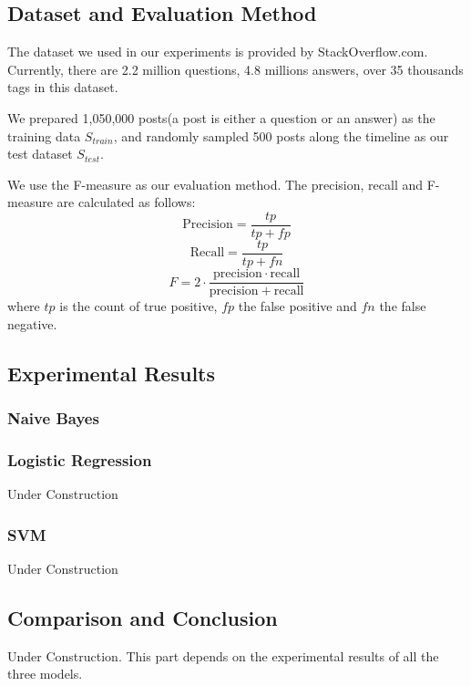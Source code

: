 
\subsection{Dataset and Evaluation Method}
The dataset we used in our experiments is provided by StackOverflow.com. Currently, there are 2.2 million questions, 4.8 millions answers, over 35 thousands tags in this dataset\cite{DataDump}.

We prepared 1,050,000 posts(a post is either a question or an answer)  as the training data $S_{train}$, and randomly sampled 500 posts along the timeline as our test dataset $S_{test}$.

We use the F-measure as our evaluation method. The precision, recall and F-measure are calculated as follows:
$$ \text{Precision}=\frac{tp}{tp+fp} $$
$$ \text{Recall}=\frac{tp}{tp+fn} $$
$$     F = 2 \cdot \frac{\mathrm{precision} \cdot \mathrm{recall}}
                        { \mathrm{precision} + \mathrm{recall}}  $$
where $tp$ is the count of true positive, $fp$ the false positive and $fn$ the false negative.

\subsection{Experimental Results}
\subsubsection{Naive Bayes}

\subsubsection{Logistic Regression}
Under Construction

\subsubsection{SVM}
Under Construction

\subsection{Comparison and Conclusion}
Under Construction. This part depends on the experimental results of all the three models.
